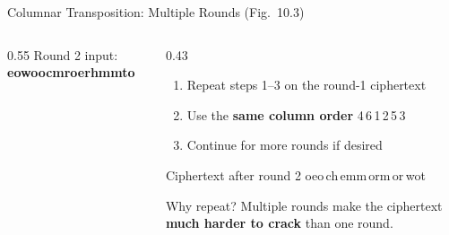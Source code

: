 \documentclass[aspectratio=169,11pt,xcolor={table}]{beamer}
\begin{document}
\begin{frame}{Columnar Transposition: Multiple Rounds (Fig.\ 10.3)}
  \begin{columns}[c]
    \begin{column}{0.55\textwidth}
      \centering
      {\small Round 2 input: \textbf{eowoocmroerhmmto}}\\[2mm]
    \end{column}
    \begin{column}{0.43\textwidth}
      \begin{enumerate}\small\setlength{\itemsep}{3pt}\setcounter{enumi}{3}
        \item Repeat steps 1--3 on the round-1 ciphertext
        \item Use the \textbf{same column order} 4\,6\,1\,2\,5\,3
        \item Continue for more rounds if desired
      \end{enumerate}
      \vspace{2mm}
      \begin{block}{Ciphertext after round 2}
        \centering\ttfamily\small oeo\,ch\,emm\,orm\,or\,wot
      \end{block}
      \begin{exampleblock}{Why repeat?}
        \small Multiple rounds make the ciphertext \textbf{much harder to crack} than one round.
      \end{exampleblock}
    \end{column}
  \end{columns}
\end{frame}
\end{document}
